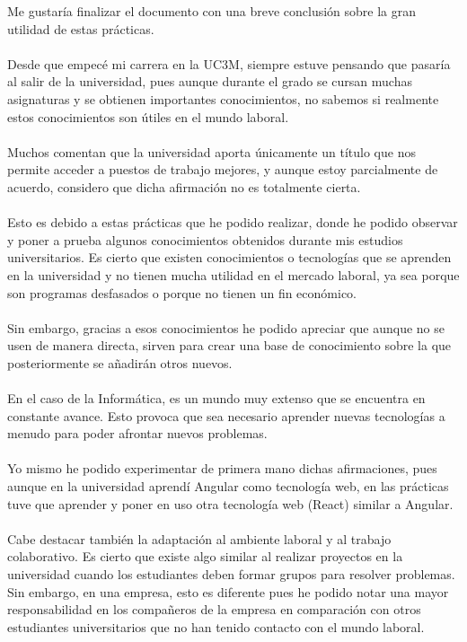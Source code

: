 \documentclass[a4paper,12pt]{article}
\begin{document}
Me gustaría finalizar el documento con una breve conclusión sobre la gran utilidad de estas prácticas.\\
\\
Desde que empecé mi carrera en la UC3M, siempre estuve pensando que pasaría al salir de la universidad, pues aunque durante el grado se cursan muchas asignaturas y se obtienen importantes conocimientos, no sabemos si realmente estos conocimientos son útiles en el mundo laboral. \\
\\
Muchos comentan que la universidad aporta únicamente un título que nos permite acceder a puestos de trabajo mejores, y aunque estoy parcialmente de acuerdo, considero que dicha afirmación no es totalmente cierta.\\
\\
Esto es debido a estas prácticas que he podido realizar, donde he podido observar y poner a prueba algunos conocimientos obtenidos durante mis estudios universitarios. Es cierto que existen conocimientos o tecnologías que se aprenden en la universidad y no tienen mucha utilidad en el mercado laboral, ya sea porque son programas desfasados o porque no tienen un fin económico. \\
\\
Sin embargo, gracias a esos conocimientos he podido apreciar que aunque no se usen de manera directa, sirven para crear una base de conocimiento sobre la que posteriormente se añadirán otros nuevos. \\
\\
En el caso de la Informática, es un mundo muy extenso que se encuentra en constante avance. Esto provoca que sea necesario aprender nuevas tecnologías a menudo para poder afrontar nuevos problemas.\\
\\
Yo mismo he podido experimentar de primera mano dichas afirmaciones, pues aunque en la universidad aprendí Angular como tecnología web, en las prácticas tuve que aprender y poner en uso otra tecnología web (React) similar a Angular.\\
\\
Cabe destacar también la adaptación al ambiente laboral y al trabajo colaborativo. Es cierto que existe algo similar al realizar proyectos en la universidad cuando los estudiantes deben formar grupos para resolver problemas. Sin embargo, en una empresa,  esto es diferente pues he podido notar una mayor responsabilidad en los compañeros de la empresa en comparación con otros estudiantes universitarios que no han tenido contacto con el mundo laboral.\\
\end{document}
